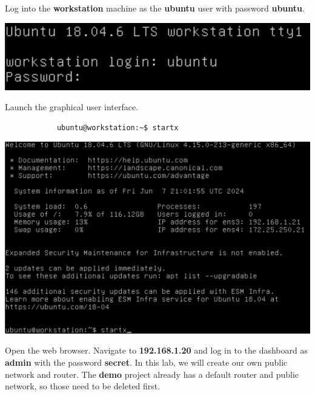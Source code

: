 \documentclass[letterpaper, 12pt]{article}
\begin{document}
\begin{enumerate}
    \begin{labstep}
        Log into the \textbf{workstation} machine as the \textbf{ubuntu} user with password \textbf{ubuntu}.

        \begin{center}
            \includegraphics[width=\linewidth]{images/part1/step1.png}
        \end{center}
    \end{labstep}

    \begin{labstep}
        Launch the graphical user interface.
        \begin{lstlisting}
            ubuntu@workstation:~$ startx
        \end{lstlisting}

        \begin{center}
            \includegraphics[width=\linewidth]{images/part1/step2.png}
        \end{center}
    \end{labstep}

    \begin{labstep}
        Open the web browser.
        Navigate to \textbf{192.168.1.20} and log in to the dashboard as \textbf{admin} with the password \textbf{secret}.
        In this lab, we will create our own public network and router.
        The \textbf{demo} project already has a default router and public network, so those need to be deleted first.
    \end{labstep}


\end{enumerate}
\end{document}
